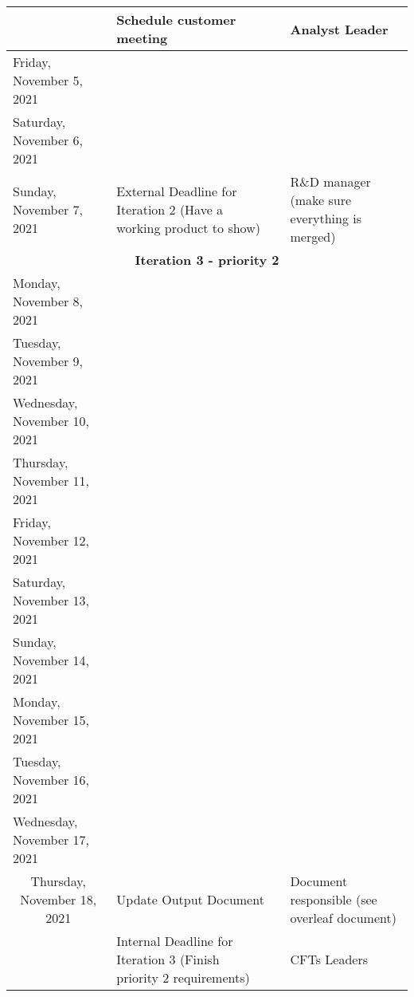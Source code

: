 \begin{adjustbox}{width=1.2\textwidth}
\begin{tabular}{|l|l|l|l|}
\multicolumn{ 1}{|c|}{} & Schedule customer meeting &            & Analyst Leader \\
\hline
Friday, November 5, 2021 &            &            &            \\
\hline
Saturday, November 6, 2021 &            &            &            \\
\hline
Sunday, November 7, 2021 & External Deadline for Iteration 2 (Have a working product to show) &            & R\&D manager (make sure everything is merged) \\
\hline
\multicolumn{ 4}{|c}{{\bf Iteration 3 - priority 2}} \\
\hline
Monday, November 8, 2021 &            &            &            \\
\hline
Tuesday, November 9, 2021 &            &            &            \\
\hline
Wednesday, November 10, 2021 &            &            &            \\
\hline
Thursday, November 11, 2021 &            &            &            \\
\hline
Friday, November 12, 2021 &            &            &            \\
\hline
Saturday, November 13, 2021 &            &            &            \\
\hline
Sunday, November 14, 2021 &            &            &            \\
\hline
Monday, November 15, 2021 &            &            &            \\
\hline
Tuesday, November 16, 2021 &            &            &            \\
\hline
Wednesday, November 17, 2021 &            &            &            \\
\hline
\multicolumn{ 1}{|c|}{Thursday, November 18, 2021} & Update Output Document  &            & Document responsible (see overleaf document) \\

\multicolumn{ 1}{|c|}{} & Internal Deadline for Iteration 3 (Finish priority 2 requirements) &            & CFTs Leaders \\


\end{tabular}
\end{adjustbox}
